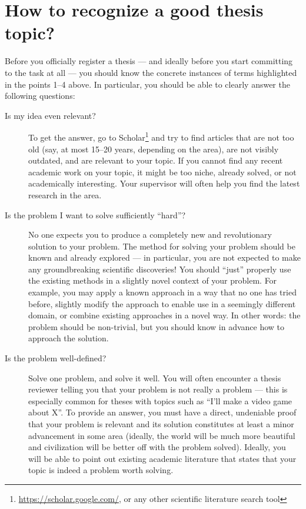 \section{How to recognize a good thesis topic?}

Before you officially register a thesis --- and ideally before you start committing to the task at all --- you should know the concrete instances of terms highlighted in the points 1--4 above. In particular, you should be able to clearly answer the following questions:

\begin{description}
\item[Is my idea even relevant?]
To get the answer, go to Scholar\footnote{\url{https://scholar.google.com/}, or any other scientific literature search tool} and try to find articles that are not too old (say, at most 15--20 years, depending on the area), are not visibly outdated, and are relevant to your topic. If you cannot find any recent academic work on your topic, it might be too niche, already solved, or not academically interesting. Your supervisor will often help you find the latest research in the area.
\item[Is the problem I want to solve sufficiently ``hard''?]
No one expects you to produce a completely new and revolutionary solution to your problem. The method for solving your problem should be known and already explored --- in particular, you are not expected to make any groundbreaking scientific discoveries! You should ``just'' properly use the existing methods in a slightly novel context of your problem. For example, you may apply a known approach in a way that no one has tried before, slightly modify the approach to enable use in a seemingly different domain, or combine existing approaches in a novel way. In other words: the problem should be non-trivial, but you should know in advance how to approach the solution.
\item[Is the problem well-defined?]
Solve one problem, and solve it well. You will often encounter a thesis reviewer telling you that your problem is not really a problem --- this is especially common for theses with topics such as ``I'll make a video game about X''. To provide an answer, you must have a direct, undeniable proof that your problem is relevant and its solution constitutes at least a minor advancement in some area (ideally, the world will be much more beautiful and civilization will be better off with the problem solved). Ideally, you will be able to point out existing academic literature that states that your topic is indeed a problem worth solving.

\end{description}
